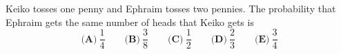 Keiko tosses one penny and Ephraim tosses two pennies. The probability that Ephraim gets the same number of heads that Keiko gets is
\[\textbf{(A)}\ \dfrac14\qquad\textbf{(B)}\ \dfrac38\qquad\textbf{(C)}\ \dfrac12\qquad\textbf{(D)}\ \dfrac23\qquad\textbf{(E)}\ \dfrac34\]
